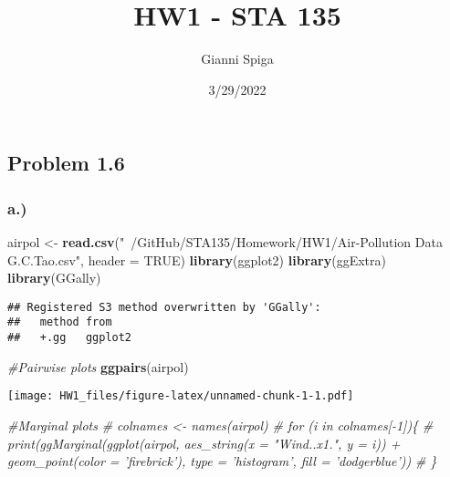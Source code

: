 \documentclass[
]{article}
\title{HW1 - STA 135}
\author{Gianni Spiga}
\date{3/29/2022}
\newenvironment{Shaded}{\begin{snugshade}}{\end{snugshade}}
\newcommand{\CommentTok}[1]{\textcolor[rgb]{0.56,0.35,0.01}{\textit{#1}}}
\newcommand{\DataTypeTok}[1]{\textcolor[rgb]{0.13,0.29,0.53}{#1}}
\newcommand{\KeywordTok}[1]{\textcolor[rgb]{0.13,0.29,0.53}{\textbf{#1}}}
\newcommand{\NormalTok}[1]{#1}
\newcommand{\OtherTok}[1]{\textcolor[rgb]{0.56,0.35,0.01}{#1}}
\newcommand{\StringTok}[1]{\textcolor[rgb]{0.31,0.60,0.02}{#1}}
\begin{document}
\maketitle

\hypertarget{problem-1.6}{%
\subsection{Problem 1.6}\label{problem-1.6}}

\hypertarget{a.}{%
\subsubsection{a.)}\label{a.}}

\begin{Shaded}
\begin{Highlighting}[]
\NormalTok{airpol <-}
\StringTok{  }\KeywordTok{read.csv}\NormalTok{(}\StringTok{"~/GitHub/STA135/Homework/HW1/Air-Pollution Data G.C.Tao.csv"}\NormalTok{,}
           \DataTypeTok{header =} \OtherTok{TRUE}\NormalTok{)}
\KeywordTok{library}\NormalTok{(ggplot2)}
\KeywordTok{library}\NormalTok{(ggExtra)}
\KeywordTok{library}\NormalTok{(GGally)}
\end{Highlighting}
\end{Shaded}

\begin{verbatim}
## Registered S3 method overwritten by 'GGally':
##   method from   
##   +.gg   ggplot2
\end{verbatim}

\begin{Shaded}
\begin{Highlighting}[]
\CommentTok{#Pairwise plots}
\KeywordTok{ggpairs}\NormalTok{(airpol)}
\end{Highlighting}
\end{Shaded}

\texttt{[image: HW1\_files/figure-latex/unnamed-chunk-1-1.pdf]}

\begin{Shaded}
\begin{Highlighting}[]
\CommentTok{#Marginal plots}
\CommentTok{# colnames <- names(airpol)}
\CommentTok{# for (i in colnames[-1])\{}
\CommentTok{#   print(ggMarginal(ggplot(airpol, aes_string(x = "Wind..x1.", y = i)) + geom_point(color = 'firebrick'), type = 'histogram', fill = 'dodgerblue'))}
\CommentTok{# \}}
\end{Highlighting}
\end{Shaded}
\end{document}
